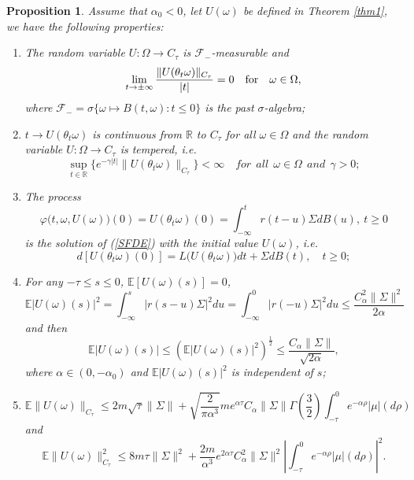 \documentclass[preprint,12pt]{elsarticle}
\newtheorem{proposition}{Proposition}[section]
\begin{document}
\begin{proposition}\label{prop1}  Assume that $\alpha_0<0$, let $U(\omega)$ be defined in Theorem \ref{thm1}, we have the following properties:
\begin{enumerate}[{\rm(i)}]
\item The random variable $U:\Omega\rightarrow C_\tau$ is $\mathscr{F}_-$-measurable and
\begin{equation}\label{OU1}
\lim_{t\rightarrow\pm\infty}\frac{\|U(\theta_t\omega)\|_{C_\tau}}{|t|}=0\quad {\rm for}\quad \omega\in\Omega,\end{equation}
where $\mathscr{F}_-=\sigma\bigl\{\omega\mapsto B(t,\omega):t\leq0\bigr\}$ is the past $\sigma$-algebra;
\item $t\rightarrow U(\theta_t\omega)$ is continuous from $\mathbb{R}$ to $C_\tau$ for all $\omega\in\Omega$ and the random variable $U:\Omega\rightarrow C_\tau$ is tempered, i.e.
   \begin{equation}\label{OU2}\sup_{t\in\mathbb{R}}\bigl\{e^{-\gamma|t|}\|U(\theta_t\omega)\|_{C_\tau}\bigr\}<\infty\quad for\ \ all\ \ \omega\in\Omega\ \ and\ \ \gamma>0;\end{equation}
\item The process
\begin{equation}\label{OU3}
\varphi\bigl(t,\omega,U(\omega)\bigr)(0)=U(\theta_{t}\omega)(0)=\int_{-\infty}^{t}r(t-u)\Sigma dB(u),\ t\geq0\end{equation}
is the solution of (\ref{SFDE}) with the initial value $U(\omega)$, i.e.
\begin{equation}\label{OU3-2}
  d[U(\theta_{t}\omega)(0)]=L\bigl(U(\theta_{t}\omega)\bigr)dt+\Sigma dB(t),\quad t\geq0;
\end{equation}
\item For any $-\tau\leq s\leq0$, $\mathbb{E}[U(\omega)(s)]=0$,
\begin{equation}\label{OU4}
\mathbb{E}|U(\omega)(s)|^2=\int_{-\infty}^{s}\left|r(s-u)\Sigma\right|^2du=\int_{-\infty}^{0}\left|r(-u)\Sigma\right|^2du\leq\frac{C_\alpha^2\|\Sigma\|^2}{2\alpha}
\end{equation}
and then
\begin{equation}\label{OU5}
\mathbb{E}|U(\omega)(s)|\leq\left(\mathbb{E}|U(\omega)(s)|^2\right)^\frac12\leq\frac{C_\alpha\|\Sigma\|}{\sqrt{2\alpha}},
\end{equation}
where $\alpha\in(0,-\alpha_0)$ and $\mathbb{E}|U(\omega)(s)|^2$ is independent of $s$;
\item
\begin{equation}\label{OU6}
\mathbb{E}\|U(\omega)\|_{C_\tau}\leq2m\sqrt\tau\|\Sigma\|+\sqrt{\frac{2}{\pi\alpha^3}}me^{\alpha\tau}C_\alpha\|\Sigma\|\Gamma\left(\frac32\right)\int_{-\tau}^0e^{-\alpha\rho}|\mu|(d\rho)
\end{equation}
and
\begin{equation}\label{OU7}
\mathbb{E}\|U(\omega)\|_{C_\tau}^2\leq8m\tau\|\Sigma\|^2+\frac{2m}{\alpha^3}e^{2\alpha\tau}C_\alpha^2\|\Sigma\|^2\left|\int_{-\tau}^0e^{-\alpha\rho}|\mu|(d\rho)\right|^2.
\end{equation}
\end{enumerate}
\end{proposition}
\end{document}
